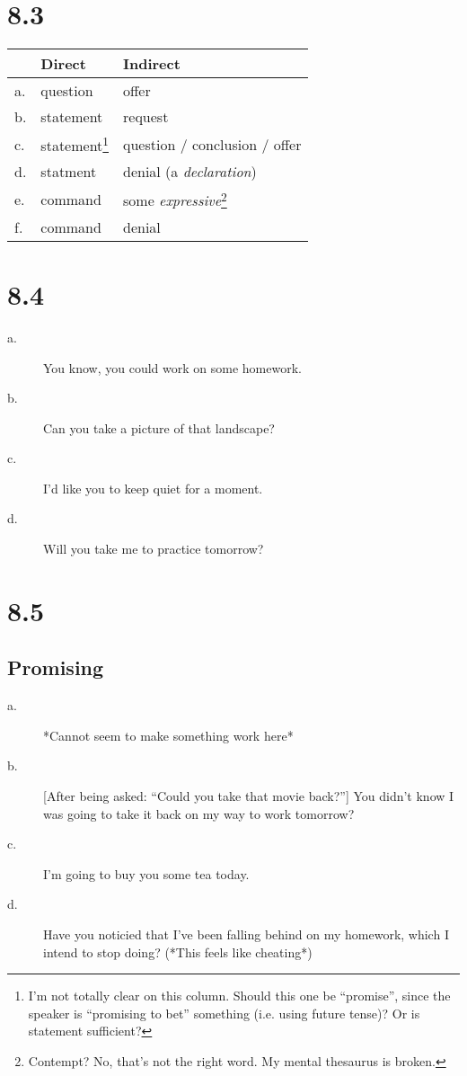 \documentclass[12pt]{article}
\begin{document}
\section*{8.3}
\begin{longtable}{l||l|l}
& \textbf{Direct} & \textbf{Indirect} \\
  \hline
a. & question & offer \\
b. & statement & request \\
c. & statement\footnote{I'm not totally clear on this column.  Should
this one be ``promise'', since the speaker is ``promising to bet''
something (i.e. using future tense)?  Or is statement sufficient?} &
question / conclusion / offer \\
d. & statment & denial (a \textit{declaration}) \\
e. & command & some \textit{expressive}\footnote{Contempt? No, that's
not the right word.  My mental thesaurus is broken.} \\
f. & command & denial \\
\end{longtable}

\section*{8.4}
\begin{description}
\item[a.] You know, you could work on some homework.
\item[b.] Can you take a picture of that landscape?
\item[c.] I'd like you to keep quiet for a moment.
\item[d.] Will you take me to practice tomorrow?
\end{description}

\section*{8.5}
\subsection*{Promising}
\begin{description}
\item[a.] *Cannot seem to make something work here*
\item[b.] [After being asked: ``Could you take that movie back?''] You
didn't know I was going to take it back on my way to work tomorrow?
\item[c.] I'm going to buy you some tea today.
\item[d.] Have you noticied that I've been falling behind on my
homework, which I intend to stop doing?  (*This feels like cheating*)
\end{description}
\end{document}
